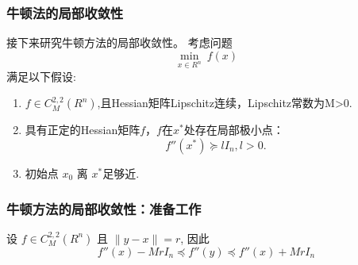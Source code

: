 \documentclass[handout,10pt]{beamer} %
\begin{document}
\begin{frame}[fragile]
\frametitle{牛顿法的局部收敛性}


接下来研究牛顿方法的局部收敛性。
考虑问题
$$
    \min_{x\in R^n}^{} \ f(x)
$$
满足以下假设:

\begin{enumerate}
    \item $f\in C_{M}^{2,2}(R^n)$,且Hessian矩阵Lipschitz连续，Lipschitz常数为M>0.
    \item 具有正定的Hessian矩阵$f$，$f$在$x^*$处存在局部极小点：
    \begin{equation}\label{EQ_1_2_22}
        f''(x^*) \succeq lI_n, l>0.
        \end{equation}
    \item 初始点 $x_0$ 离 $x^*$足够近.
\end{enumerate}



\end{frame}

\begin{frame}[fragile]
\frametitle{牛顿方法的局部收敛性：准备工作}

\begin{corollary}[推论]\label{coro_1_2_2}

    设 $f \in C_M^{2,2}(R^n)$ 且 $ \|y-x\| =r$, 因此
    $$
        f''(x) - MrI_n \preceq f''(y) \preceq f''(x)+ MrI_n
    $$
\end{corollary}


\end{frame}
\end{document}
